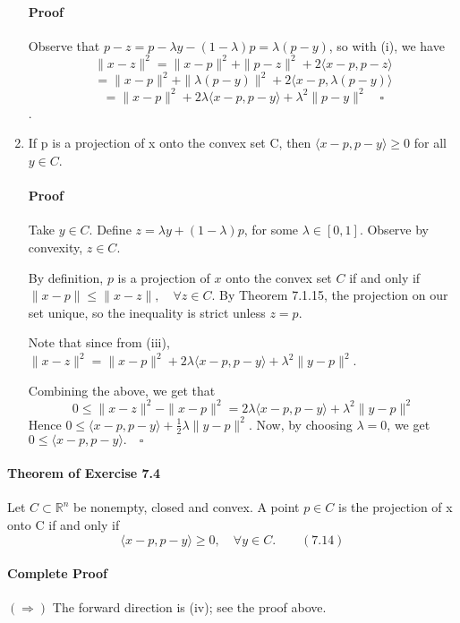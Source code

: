 \documentclass[letterpaper,12pt]{article}
\theoremstyle{definition}
\begin{document}
\begin{enumerate}[label = (\roman*)]
\paragraph{Proof} Observe that $p - z = p - \lambda y - (1 - \lambda)p = \lambda (p - y)$, so with (i), we have $$\| x - z\|^2 
= \| x - p\|^2 + \| p - z\|^2 + 2 \langle x - p, p - z \rangle$$
$$= \| x - p\|^2 + \| \lambda (p - y)\|^2 + 2 \langle x - p, \lambda (p - y) \rangle$$
$$= \| x - p\|^2 + 2 \lambda \langle x - p, p - y \rangle + \lambda^2 \| p - y\|^2 \quad \square$$.


\item If p is a projection of x onto the convex set C, then $\langle x - p, p - y \rangle \ge 0$ for all $y \in C$.

\paragraph{Proof} 

Take $y \in C$. Define $ z = \lambda y + (1 - \lambda)p$, for some $\lambda \in [0,1]$. Observe by convexity, $z \in C$.

By definition, $p$ is a projection  of $x$ onto the convex set $C$ if and only if $\| x - p\| \le \| x - z \|, \quad \forall z \in C$. By Theorem 7.1.15, the projection on our set unique, so the inequality is strict unless $z = p$.

Note that since from (iii), $\|x - z\|^2 = \| x - p\|^2 + 2 \lambda \langle x - p, p - y \rangle + \lambda^2 \| y - p \|^2$.

Combining the above, we get that 
$$ 0 \le \| x - z \|^2 - \| x - p\|^2 = 2 \lambda \langle x - p, p - y \rangle + \lambda^2 \| y - p \|^2 $$
Hence $0 \le \langle x - p, p - y \rangle + \frac{1}{2 }\lambda \| y - p \|^2 $. Now, by choosing $\lambda = 0$, we get $0 \le \langle x - p, p - y \rangle. \quad \square$

\end{enumerate}

\paragraph{Theorem of Exercise 7.4} Let $ C \subset \mathbb{R}^n$ be nonempty, closed and convex. A point $p \in C$ is the projection of x onto C if and only if
$$ \langle x - p, p - y \rangle \ge 0, \quad \forall y \in C. \qquad (7.14)$$
\paragraph{Complete Proof} $(\Rightarrow)$ The forward direction is (iv); see the proof above.
\end{document}
